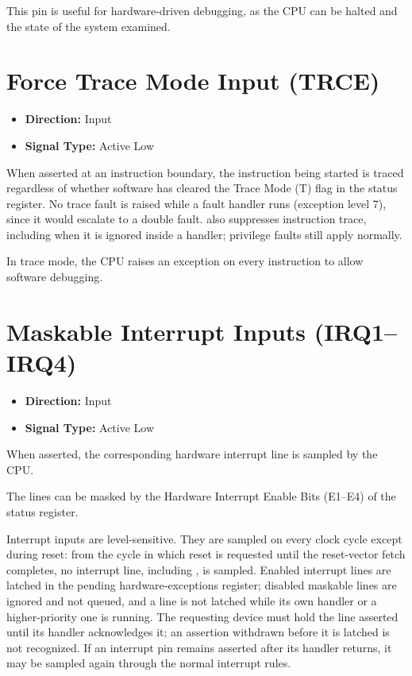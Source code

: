 This pin is useful for hardware-driven debugging, as the CPU can be halted and the state of the system examined.

\section{Force Trace Mode Input (TRCE)}

\begin{itemize}
	\item \textbf{Direction:} Input
	\item \textbf{Signal Type:} Active Low
\end{itemize}

When asserted at an instruction boundary, the instruction being started is traced regardless of whether software has
cleared the Trace Mode (T) flag in the status register. No trace fault is raised while a fault handler runs (exception
level 7), since it would escalate to a double fault.  also suppresses instruction trace, including when
it is ignored inside a handler; privilege faults still apply normally.

In trace mode, the CPU raises an exception on every instruction to allow software debugging.

\section{Maskable Interrupt Inputs (IRQ1--IRQ4)}

\begin{itemize}
	\item \textbf{Direction:} Input
	\item \textbf{Signal Type:} Active Low
\end{itemize}

When asserted, the corresponding hardware interrupt line is sampled by the CPU.

The lines can be masked by the Hardware Interrupt Enable Bits (E1--E4) of the status register.

Interrupt inputs are level-sensitive. They are sampled on every clock cycle except during reset: from the cycle in
which reset is requested until the reset-vector fetch completes, no interrupt line, including , is
sampled. Enabled interrupt lines are latched in the pending hardware-exceptions register; disabled maskable lines are
ignored and not queued, and a line is not latched while its own handler or a higher-priority one is running. The
requesting device must hold the line asserted until its handler acknowledges it; an assertion withdrawn before it is
latched is not recognized. If an interrupt pin remains asserted after its handler returns, it may be sampled again
through the normal interrupt rules.

